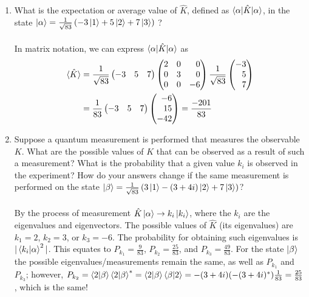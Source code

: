 \documentclass[11pt,letterpaper]{article}
\begin{document}
\begin{enumerate}
\begin{enumerate}
  \item What is the expectation or average value of $\hat K$, defined as $\braket{\alpha|\hat K| \alpha}$, in the state $\ket \alpha = \frac{1}{\sqrt{83}}\left(-3\ket 1 + 5\ket 2 + 7 \ket 3\right)$ ?
  \\ \\ In matrix notation, we can express $\braket{\alpha|\hat K|\alpha}$ as
  \begin{align*}\braket{\hat K}&=\frac{1}{\sqrt{83}}\begin{pmatrix}-3&5&7\end{pmatrix}
  \begin{pmatrix*}[r] 2&0&0\\0&3&0\\0&0&-6\end{pmatrix*}
  \frac{1}{\sqrt{83}}\begin{pmatrix*}[r]-3\\5\\7\end{pmatrix*}\\
  &= \frac{1}{83}\begin{pmatrix}-3&5&7\end{pmatrix}
  \begin{pmatrix*}[r] -6\\15\\-42\end{pmatrix*} = \frac{-201}{83}\end{align*}
  
  \item Suppose a quantum measurement is performed that measures the observable $K$. What are the possible values of $K$ that can be observed as a result of such a measurement? What is the probability that a given value $k_i$ is observed in the experiment? How do your answers change if the same measurement is performed on the state $\ket \beta = \frac{1}{\sqrt{83}}\left(3\ket 1 -(3+4i)\ket 2 + 7 \ket 3\right)$?
  \\ \\By the process of measurement $\hat K\ket\alpha \rightarrow k_i\ket{k_i}$, where the $k_i$ are the eigenvalues and eigenvectors. The possible values of $\hat K$ (its eigenvalues) are $k_1 = 2$, $k_2=3$, or $k_3=-6$. The probability for obtaining such eigenvalues is $|\braket{k_i|\alpha}^2|$. This equates to $P_{k_1} = \frac{9}{83}$, $P_{k_2}=\frac{25}{83}$, and $P_{k_3}=\frac{49}{83}$. For the state $\ket \beta$ the possible eigenvalues/measurements remain the same, as well as $P_{k_1}$ and $P_{k_3}$; however, $P_{k_2} = \braket{2|\beta}\braket{2|\beta}^* = \braket{2|\beta}\braket{\beta|2} = -(3+4i)(-(3+4i)^*)\frac{1}{83} = \frac{25}{83}$, which is the same! 
  \end{enumerate}


\end{enumerate}
\end{document}
